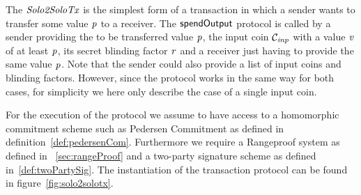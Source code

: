 The $\mathit{Solo2SoloTx}$ is the simplest form of a transaction in which a sender wants to transfer some value $\mathit{p}$ to a receiver. The $\mathsf{spendOutput}$ protocol is called by a sender providing the to be transferred value
$\mathit{p}$, the input coin $\mathcal{C}_{\mathit{inp}}$ with a value $\mathit{v}$ of at least $\mathit{p}$, its secret blinding factor $\mathit{r}$ and a receiver just having to provide the same value $\mathit{p}$. Note that the
sender could also provide a list of input coins and blinding factors. However, since the protocol works in the same way for both cases, for simplicity we here only describe the case of a single input coin.

For the execution of the protocol we assume to have access to a homomorphic commitment scheme such as Pedersen Commitment as defined in definition~\ref{def:pedersenCom}. Furthermore we require a Rangeproof system as defined in
~\ref{sec:rangeProof} and a two-party signature scheme as defined in~\ref{def:twoPartySig}. The instantiation of the transaction protocol can be found in figure~\ref{fig:solo2solotx}.


